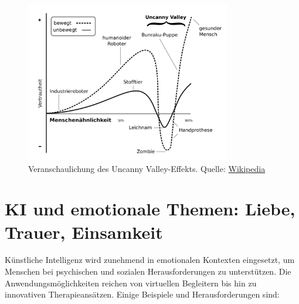 \documentclass[a4paper,12pt]{article}
\begin{document}
\begin{figure}[h]
    \centering
    \includegraphics[width=0.8\textwidth]{image-2.png}
    \caption{Veranschaulichung des Uncanny Valley-Effekts.
    Quelle: \href{https://de.wikipedia.org}{Wikipedia}}
    \label{fig:example2}
\end{figure}

\section{KI und emotionale Themen: Liebe, Trauer, Einsamkeit}

Künstliche Intelligenz wird zunehmend in emotionalen Kontexten eingesetzt, um Menschen bei psychischen und sozialen Herausforderungen zu unterstützen. Die Anwendungsmöglichkeiten reichen von virtuellen Begleitern bis hin zu innovativen Therapieansätzen. Einige Beispiele und Herausforderungen sind:
\end{document}
